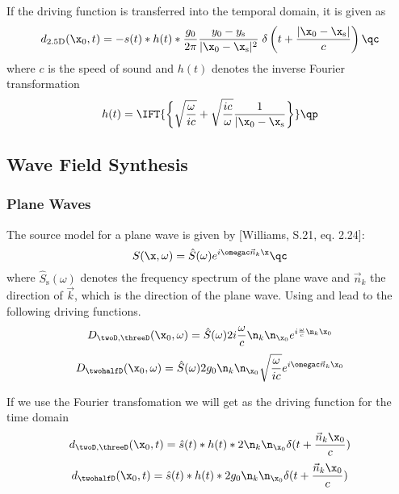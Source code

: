 \documentclass{article}
\begin{document}
If the driving function 
is transferred into the temporal domain,
it is given as
\begin{equation}
    d_{\text{2.5D}}(\x_0,t) = -s(t) * h(t) *
    \frac{g_0}{2\pi}
    \frac{y_0 - y_\text{s}}{|\x_0-\x_\text{s}|^{2}}
    \;\delta\left(t + \frac{|\x_0-\x_\text{s}|}{c}\right)
    \qc
\label{eq:d}
\end{equation}
where $c$ is the speed of sound and
$h(t)$ denotes the inverse Fourier transformation
\begin{equation} 
    h(t) =
    \IFT{\biggl\{ \sqrt{\frac{\omega}{ic}} + \sqrt{\frac{ic}{\omega}}
    \frac{1}{|\x_0-\x_\text{s}} \biggr\}} 
    \qp
    \label{eq:h}
\end{equation}


\subsection{Wave Field Synthesis}
\label{sec:wfs}

\subsubsection{Plane Waves}
The source model for a plane wave is given by [Williams, S.21, eq. 2.24]:
\begin{equation} 
    S(\x,\omega) = 
    \hat{S}(\omega)
    e^{i\omegac \vec{n}_k \x}
    \qc
\end{equation}
where $\hat{S}_\text{s}(\omega)$ denotes the frequency spectrum of the plane
wave and $\vec{n}_k$ the direction of $\vec{k}$, which is the direction of the
plane wave.
Using  and  lead to the following driving functions.
\begin{equation}
    D_{\twoD, \threeD}(\x_0,\omega) = \hat{S}(\omega)
    2 i \frac{\omega}{c} \n_k \n_{\x_0} e^{i\frac{\omega}{c} \n_k \x_0}
    \label{D_pw}
\end{equation}
\begin{equation}
    D_\twohalfD(\x_0,\omega) = \hat{S}(\omega)
    2 g_0 \n_k \n_{\x_0} \sqrt{\frac{\omega}{ic}}
    e^{i\omegac \vec{n}_k \x_0}
    \label{D_25D_pw}
\end{equation}


If we use the Fourier transfomation we will get as the driving function for the
time domain
\begin{equation}
    d_{\twoD, \threeD}(\x_0,t) = \hat{s}(t) * h(t) * 2 \n_k \n_{\x_0} \delta(t +
    \frac{\vec{n}_k \x_0}{c})
    \label{d_pw}
\end{equation}
\begin{equation}
    d_\twohalfD(\x_0,t) = \hat{s}(t) * h(t) * 2 g_0 \n_k \n_{\x_0} \delta(t +
    \frac{\vec{n}_k \x_0}{c})
    \label{d_25D_pw}
\end{equation}
\end{document}
